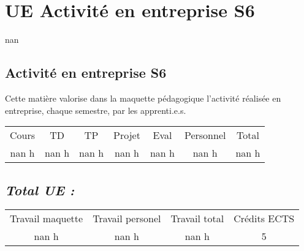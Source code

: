 \section{UE Activité en entreprise S6}%
\label{sec:UEActivitenentrepriseS6}%
nan%
\subsection{Activité en entreprise S6}%
\label{subsec:ActivitenentrepriseS6}%

%
Cette matière valorise dans la maquette pédagogique l'activité réalisée en entreprise, chaque semestre, par les apprenti.e.s.%
\begin{longtable}{c c c c c c c}%
\hline%
Cours&TD&TP&Projet&Eval&Personnel&Total\\%
nan h&nan h&nan h&nan h&nan h&nan h&nan h\\%
\hline%
\end{longtable}%
\subsection{\textit{Total UE :}}%
\label{subsec:textitTotalUE}%

%
\begin{longtable}{c c c c}%
\hline%
Travail maquette&Travail personel&Travail total&Crédits ECTS\\%
nan h&nan h&nan h&5\\%
\hline%
\end{longtable}